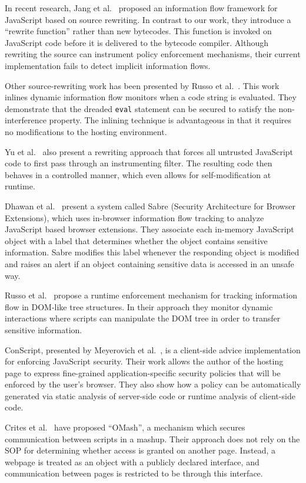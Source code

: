 In recent research, Jang et al.~\cite{1866339} proposed an information flow framework for JavaScript based on source rewriting.
In contrast to our work, they introduce a ``rewrite function'' rather than new bytecodes.
This function is invoked on JavaScript code before it is delivered to the bytecode compiler.
Although rewriting the source can instrument policy enforcement mechanisms, their current implementation fails to detect implicit information flows.

Other source-rewriting work has been presented by Russo et al.~\cite{onthefly}.
This work inlines dynamic information flow monitors when a code string is evaluated.
They demonstrate that the dreaded \texttt{eval} statement can be secured to satisfy the non-interference property.
The inlining technique is advantageous in that it requires no modifications to the hosting environment.

Yu et al.~\cite{1190252} also present a rewriting approach that forces all untrusted JavaScript code to first pass through an instrumenting filter.
The resulting code then behaves in a controlled manner, which even allows for self-modification at runtime.

Dhawan et al.~\cite{1723250} present a system called Sabre (Security Architecture for Browser Extensions), which uses in-browser information flow tracking to analyze JavaScript based browser extensions.
They associate each in-memory JavaScript object with a label that determines whether the object contains sensitive information.
Sabre modifies this label whenever the responding object is modified and raises an alert if an object containing sensitive data is accessed in an unsafe way.

Russo et al.~\cite{1813092} propose a runtime enforcement mechanism for tracking information flow in DOM-like tree structures.
In their approach they monitor dynamic interactions where scripts can manipulate the DOM tree in order to transfer sensitive information.

ConScript, presented by Meyerovich et al.~\cite{5504806}, is a client-side advice implementation for enforcing JavaScript security.
Their work allows the author of the hosting page to express fine-grained application-specific security policies that will be enforced by the user's browser.
They also show how a policy can be automatically generated via static analysis of server-side code or runtime analysis of client-side code.

Crites et al.~\cite{1455784} have proposed ``OMash'', a mechanism which secures communication between scripts in a mashup.
Their approach does not rely on the SOP for determining whether access is granted on another page.
Instead, a webpage is treated as an object with a publicly declared interface, and communication between pages is restricted to be through this interface.

